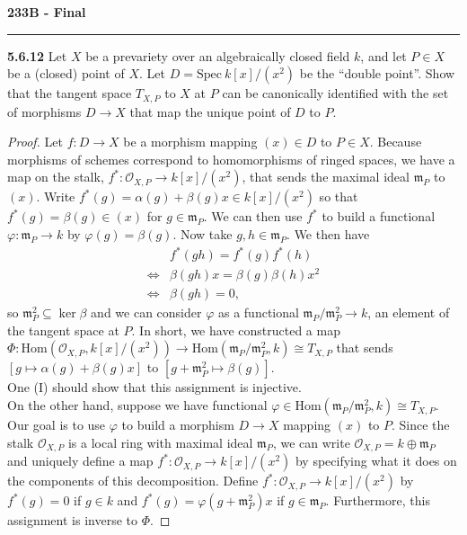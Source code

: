 \documentclass[11pt,letterpaper]{report}
\newcommand{\mcal}[1]{\mathcal{#1}}
\newcommand{\Hom}{\text{Hom}}
\newcommand{\Spec}{\text{Spec}}
\begin{document}
\begin{center}
{\bf \Large 233B - Final} %
\vspace{0.2cm}
\hrule
\end{center}



\noindent\textbf{5.6.12}
Let $X$ be a prevariety over an algebraically closed field $k$, and let $P\in X$ be a (closed) point of $X$. Let $D = \Spec\ k[x]/(x^2)$ be the ``double point''. Show that the tangent space $T_{X,P}$ to $X$ at $P$ can be canonically identified with the set of morphisms $D\to X$ that map the unique point of $D$ to $P$.
\begin{proof}
	Let $f:D\to X$ be a morphism mapping $(x)\in D$ to $P\in X$. Because morphisms of schemes correspond to homomorphisms of ringed spaces, we have a map on the stalk, $f^*: \mcal{O}_{X, P}\to k[x]/(x^2)$, that sends the maximal ideal $\mathfrak{m}_P$ to $(x)$. Write $f^*(g) = \alpha(g) + \beta(g)x\in k[x]/(x^2)$ so that $f^*(g) = \beta(g)\in (x)$ for $g\in \mathfrak{m}_P$.  We can then use $f^*$ to build a functional $\varphi: \mathfrak{m}_P\to k$ by $\varphi(g) = \beta(g)$. Now take $g,h\in \mathfrak{m}_P$. We then have
	\begin{align*}
		&f^*(gh) = f^*(g)f^*(h)\\
		\iff& \beta(gh)x = \beta(g)\beta(h)x^2\\
		\iff&\beta(gh) = 0,
	\end{align*}
	so $\mathfrak{m}_P^2\subseteq \ker \beta$ and we can consider $\varphi$ as a functional $\mathfrak{m}_P/\mathfrak{m}_P^2\to k$, an element of the tangent space at $P$. In short, we have constructed a map $\Phi: \Hom(\mcal{O}_{X, P}, k[x]/(x^2))\to \Hom(\mathfrak{m}_P/\mathfrak{m}_P^2, k)\cong T_{X, P}$ that sends $[g\mapsto \alpha(g)+\beta(g)x]$ to $[g+\mathfrak{m}_P^2\mapsto \beta(g)]$.\\

	\noindent One (I) should show that this assignment is injective.\\

	\noindent On the other hand, suppose we have functional $\varphi\in \Hom(\mathfrak{m}_P/\mathfrak{m}_P^2, k) \cong T_{X, P}$. Our goal is to use $\varphi$ to build a morphism $D\to X$ mapping $(x)$ to $P$. Since the stalk $\mcal{O}_{X, P}$ is a local ring with maximal ideal $\mathfrak{m}_P$, we can write $\mcal{O}_{X, P} = k\oplus \mathfrak{m}_P$ and uniquely define a map $f^*: \mcal{O}_{X, P}\to k[x]/(x^2)$ by specifying what it does on the components of this decomposition. Define $f^*: \mcal{O}_{X, P}\to k[x]/(x^2)$ by $f^*(g) = 0$ if $g\in k$ and $f^*(g) = \varphi(g+\mathfrak{m}_P^2)x$ if $g\in \mathfrak{m}_P$. Furthermore, this assignment is inverse to $\Phi$.
\end{proof}
\end{document}
